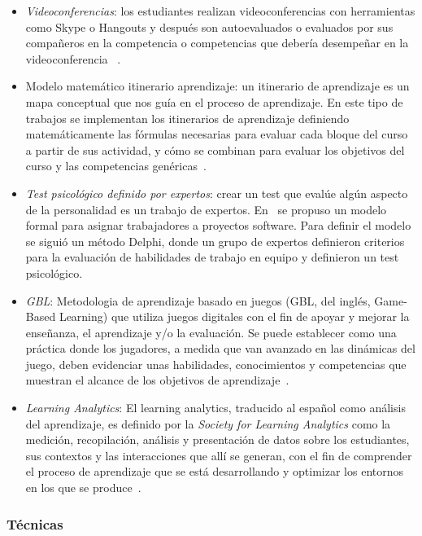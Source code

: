 \begin{itemize}
\item \emph{Videoconferencias}: los estudiantes realizan videoconferencias con herramientas como Skype o Hangouts y después son autoevaluados o evaluados por sus compañeros en la competencia o competencias que debería desempeñar en la videoconferencia~ \cite{masip2013self,ward2011developing}.
\item Modelo matemático itinerario aprendizaje: un itinerario de aprendizaje es un mapa conceptual que nos guía en el proceso de aprendizaje. En este tipo de trabajos se implementan los itinerarios de aprendizaje definiendo matemáticamente las fórmulas necesarias para evaluar cada bloque del curso a partir de sus actividad, y cómo se combinan para evaluar los objetivos del curso y las competencias genéricas~\cite{yang2014fine}.
\item \emph{Test psicológico definido por expertos}: crear un test que evalúe algún aspecto de la personalidad es un trabajo de expertos. En~\cite{andre2011formal} se propuso un modelo formal para asignar trabajadores a proyectos software. Para definir el modelo se siguió un método Delphi, donde un grupo de expertos definieron criterios para la evaluación de habilidades de trabajo en equipo y definieron un test psicológico.
\item \emph{GBL}: Metodologia de aprendizaje basado en juegos (GBL, del inglés, Game-Based Learning) que utiliza juegos digitales con el fin de apoyar y mejorar la enseñanza, el aprendizaje y/o la evaluación. Se puede establecer como una práctica donde los jugadores, a medida que van avanzado en las dinámicas del juego, deben evidenciar unas habilidades, conocimientos y competencias que muestran el alcance de los objetivos de aprendizaje~\cite{charlier2012not}.
\item \emph{Learning Analytics}: El learning analytics, traducido al español como análisis del aprendizaje, es definido por la \emph{Society for Learning Analytics} como la medición, recopilación, análisis y presentación de datos sobre los estudiantes, sus contextos y las interacciones que allí se generan, con el fin de comprender el proceso de aprendizaje que se está desarrollando y optimizar los entornos en los que se produce~\cite{siemens2012learning}.
\end{itemize}

\subsubsection{Técnicas}

